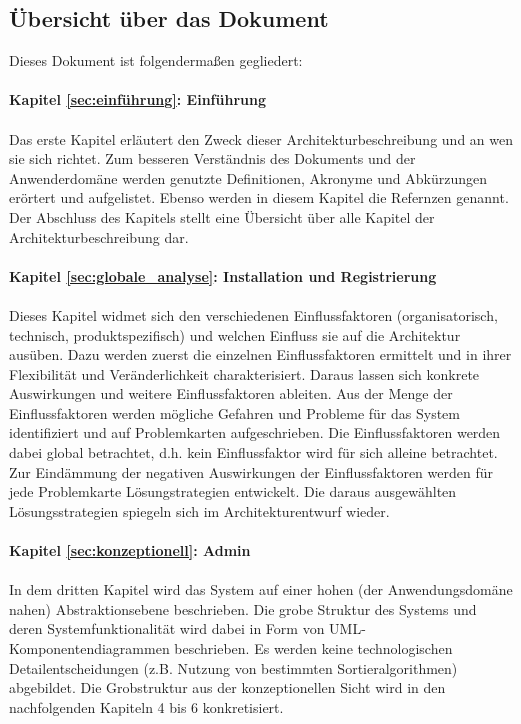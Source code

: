 \subsection{Übersicht über das Dokument}
Dieses Dokument ist folgendermaßen gegliedert:\\
\\
\textbf{Kapitel \ref{sec:einführung}: Einführung} %
\\
\\
{  Das erste Kapitel erläutert den Zweck dieser Architekturbeschreibung und an wen sie sich richtet. Zum besseren Verständnis des Dokuments und der Anwenderdomäne werden genutzte Definitionen, Akronyme und Abkürzungen erörtert und aufgelistet. 
Ebenso werden in diesem Kapitel die Refernzen genannt. Der Abschluss des Kapitels stellt eine Übersicht über alle Kapitel der Architekturbeschreibung dar.}
\\
\\

\textbf{Kapitel \ref{sec:globale_analyse}: Installation und Registrierung} %
\\
\\
{ Dieses Kapitel widmet sich den verschiedenen Einflussfaktoren (organisatorisch, technisch, produktspezifisch) und welchen Einfluss sie auf die Architektur ausüben. Dazu werden zuerst die einzelnen Einflussfaktoren ermittelt und in ihrer
Flexibilität und Veränderlichkeit charakterisiert. Daraus lassen sich konkrete Auswirkungen und weitere Einflussfaktoren ableiten. Aus der Menge der Einflussfaktoren werden mögliche Gefahren und Probleme für das System identifiziert und auf Problemkarten aufgeschrieben. Die Einflussfaktoren werden dabei global betrachtet, d.h. kein Einflussfaktor wird für sich alleine betrachtet. Zur Eindämmung der negativen Auswirkungen  der Einflussfaktoren werden für jede Problemkarte Lösungstrategien entwickelt. Die daraus ausgewählten Lösungsstrategien spiegeln sich im Architekturentwurf wieder.}
\\
\\

\textbf{Kapitel \ref{sec:konzeptionell}: Admin} %
\\
\\
{In dem dritten Kapitel wird das System auf einer hohen (der Anwendungsdomäne nahen) Abstraktionsebene beschrieben.
Die grobe Struktur des Systems und deren Systemfunktionalität wird dabei in Form von UML-Komponentendiagrammen beschrieben.
Es werden keine technologischen Detailentscheidungen (z.B. Nutzung von bestimmten Sortieralgorithmen) abgebildet.
Die Grobstruktur aus der konzeptionellen Sicht wird in den nachfolgenden Kapiteln 4 bis 6 konkretisiert.}
\\
\\

